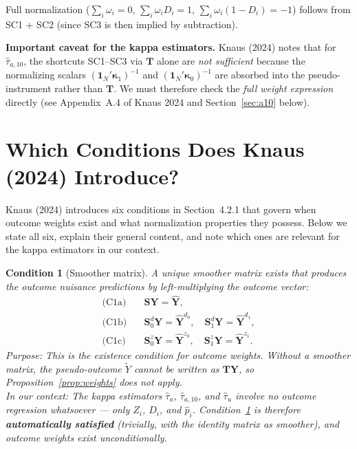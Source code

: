 \documentclass[12pt, a4paper]{article}
\theoremstyle{condstyle}
\newtheorem{condition}{Condition}[section]
\theoremstyle{plain}
\newcommand{\bone}{\mathbf{1}_N}
\newcommand{\tY}{\tilde{Y}}
\newcommand{\that}[1]{\hat{\tau}_{#1}}
\newcommand{\phat}{\hat{p}}
\begin{document}
\noindent Full normalization ($\sum_i\omega_i=0$, $\sum_i\omega_iD_i=1$, $\sum_i\omega_i(1-D_i)=-1$)
follows from SC1 + SC2 (since SC3 is then implied by subtraction).

\medskip
\noindent\textbf{Important caveat for the kappa estimators.}
Knaus (2024) notes that for $\that{a,10}$,
the shortcuts SC1--SC3 via $\mathbf{T}$ alone are \emph{not sufficient}
because the normalizing scalars $({\bone}'\boldsymbol{\kappa}_1)^{-1}$ and
$({\bone}'\boldsymbol{\kappa}_0)^{-1}$ are absorbed into the pseudo-instrument
rather than $\mathbf{T}$.
We must therefore check the \emph{full weight expression} directly
(see Appendix~A.4 of Knaus 2024 and Section~\ref{sec:a10} below).

\section{Which Conditions Does Knaus (2024) Introduce?}
\label{sec:conditions}

Knaus (2024) introduces six conditions in Section~4.2.1 that govern
when outcome weights exist and what normalization properties they possess.
Below we state all six, explain their general content, and note
which ones are relevant for the kappa estimators in our context.

\begin{condition}[Smoother matrix]\label{cond:smoother}
  A unique smoother matrix exists that produces the outcome nuisance predictions
  by left-multiplying the outcome vector:
  \begin{align*}
    \text{(C1a)} &\quad \mathbf{S}\mathbf{Y} = \hat{\mathbf{Y}},\\
    \text{(C1b)} &\quad \mathbf{S}^d_0\mathbf{Y} = \hat{\mathbf{Y}}^{d_0},\quad
                         \mathbf{S}^d_1\mathbf{Y} = \hat{\mathbf{Y}}^{d_1},\\
    \text{(C1c)} &\quad \mathbf{S}^z_0\mathbf{Y} = \hat{\mathbf{Y}}^{z_0},\quad
                         \mathbf{S}^z_1\mathbf{Y} = \hat{\mathbf{Y}}^{z_1}.
  \end{align*}
  \textit{Purpose:} This is the existence condition for outcome weights.
  Without a smoother matrix, the pseudo-outcome $\tY$ cannot be written as $\mathbf{T}\mathbf{Y}$,
  so Proposition~\ref{prop:weights} does not apply.\\
  \textit{In our context:} The kappa estimators $\that{a}$, $\that{a,10}$, and $\that{u}$
  involve \emph{no outcome regression whatsoever} --- only $Z_i$, $D_i$, and $\phat_i$.
  Condition~\ref{cond:smoother} is therefore \textbf{automatically satisfied} (trivially,
  with the identity matrix as smoother), and outcome weights exist unconditionally.
\end{condition}
\end{document}
